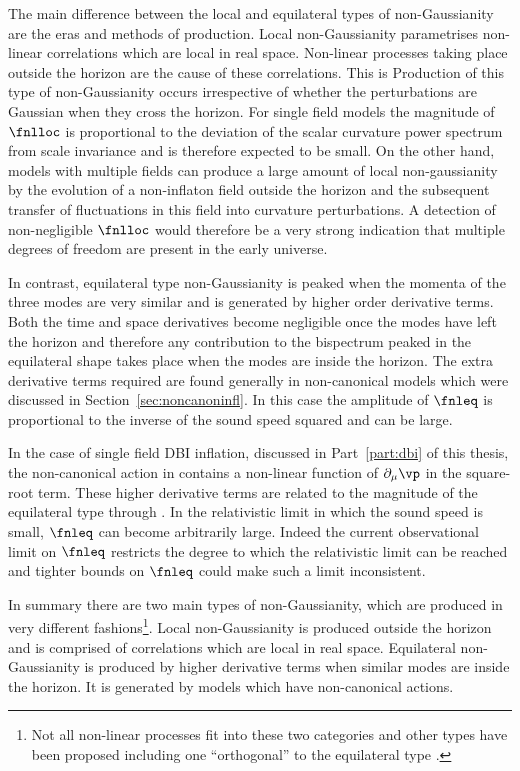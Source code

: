  The main difference between the local and equilateral types of non-Gaussianity are the eras
and methods of production. Local
non-Gaussianity parametrises non-linear correlations which are local in real space. Non-linear
processes taking place outside the horizon are the cause of these correlations. This is   
Production of this type of non-Gaussianity occurs irrespective of whether the perturbations
are Gaussian when they cross the horizon. 
For single field models the magnitude
of $\fnlloc$ is proportional to the deviation of the scalar curvature power spectrum from scale
invariance and is therefore expected to be small. On the other hand, models with multiple fields 
can produce a large amount of local non-gaussianity by the evolution of a non-inflaton field 
outside the horizon and the subsequent transfer of fluctuations in this field into curvature
perturbations. A detection of non-negligible $\fnlloc$ would therefore be a very strong indication
that multiple degrees of freedom are present in the early universe.

In contrast, equilateral type non-Gaussianity is peaked when the momenta of the three modes are very
similar and is generated by higher order derivative terms. Both the time and space derivatives
become negligible once the modes have left the horizon and therefore any contribution to the
bispectrum peaked in the equilateral shape takes place when the modes are inside the
horizon. The extra derivative terms required are found generally in non-canonical models
which were discussed in Section~\ref{sec:noncanoninfl}. In this case the amplitude of $\fnleq$ is
proportional to the inverse of the sound speed squared and can be large.

In the case of single field DBI inflation, discussed in Part~\ref{part:dbi} of this thesis, the
non-canonical action in 
contains a non-linear function of $\partial_\mu \vp$ in the square-root term. These higher
derivative
terms are related to the magnitude of the equilateral type through . In the
relativistic limit in which the sound speed is small, $\fnleq$ can become arbitrarily large. Indeed
the current observational limit on $\fnleq$ restricts the degree to which the relativistic limit
can be reached and tighter bounds on $\fnleq$ could make such a limit inconsistent.

In summary there are two main types of non-Gaussianity, which are produced in very different
fashions\footnote{Not all non-linear processes fit into these two categories and other types have
been proposed including one ``orthogonal'' to the equilateral type \cite{Senatore:2009gt}.}. Local
non-Gaussianity is produced outside the horizon and is comprised of correlations which are local in
real space. Equilateral non-Gaussianity is produced by higher derivative terms when similar modes
are inside the horizon. It is generated by models which have non-canonical actions.



